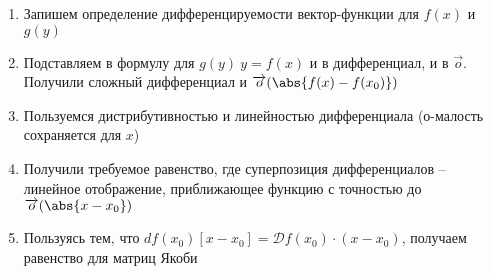 \begin{enumerate}
    \item Запишем определение дифференцируемости вектор-функции для $f(x)$ и $g(y)$
    \item Подставляем в формулу для $g(y)~y = f(x)$ и в дифференциал, и в $\overrightarrow{o}$.
    Получили сложный дифференциал и $\overrightarrow{o}(\abs{f(x) - f(x_0)})$
    \item Пользуемся дистрибутивностью и линейностью дифференциала (о-малость сохраняется для $x$)
    \item Получили требуемое равенство, где суперпозиция дифференциалов -- линейное отображение, приближающее функцию с
    точностью до  $\overrightarrow{o}(\abs{x - x_0})$
    \item Пользуясь тем, что $df(x_0)[x - x_0] = \mathcal{D} f(x_0) \cdot (x - x_0)$, получаем равенство для матриц Якоби
\end{enumerate}